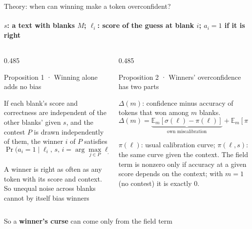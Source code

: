 \documentclass[aspectratio=169,10pt,t]{beamer}
\newcommand{\fnote}[1]{{\color{ink2}\scriptsize #1\par}}
\newcommand{\paneltitle}[1]{{\color{accentdark}\small\firasemibold #1}\par\vspace{0.8mm}}
\begin{document}
\begin{frame}{Theory: when can winning make a token overconfident?}
  \framesubtitle{$s$: a text with blanks $M$; $\ell_i$: score of the guess at blank $i$; $a_i = 1$ if it is right}
  \vspace{1.5mm}
  \begin{columns}[T,onlytextwidth]
    \begin{column}{0.485\textwidth}
      \begin{panel}[height=40mm]
        \paneltitle{Proposition 1 · Winning alone adds no bias}
        If each blank's score and correctness are independent of the other blanks' given $s$,
        and the contest $P$ is drawn independently of them, the winner $i$ of $P$ satisfies
        \[
          \Pr\big(a_i = 1 \mid \ell_i,\, s,\, i = \arg\max_{j\in P} \ell_j\big) = \pi(\ell_i, s).
        \]
        \fnote{A winner is right as often as any token with its score and context. So unequal
        noise across blanks cannot by itself bias winners}
      \end{panel}
    \end{column}
    \begin{column}{0.485\textwidth}
      \begin{panel}[height=40mm]
        \paneltitle{Proposition 2 · Winners' overconfidence has two parts}
        $\Delta(m)$: confidence minus accuracy of tokens that won among $m$ blanks.
        \[
          \Delta(m) =
          \underbrace{\mathbb{E}_m[\sigma(\ell) - \pi(\ell)]}_{\text{own miscalibration}}
          + \underbrace{\mathbb{E}_m[\pi(\ell) - \pi(\ell, s)]}_{\text{field term}}
        \]
        \fnote{$\pi(\ell)$: usual calibration curve; $\pi(\ell,s)$: the same curve given the
        context. The field term is nonzero only if accuracy at a given score depends on the
        context; with $m = 1$ (no contest) it is exactly 0.}
      \end{panel}
    \end{column}
  \end{columns}
  \vspace{2.5mm}
  \begin{takeaway}
    So a \textbf{winner's curse} can come only from the field term
  \end{takeaway}
\end{frame}
\end{document}
